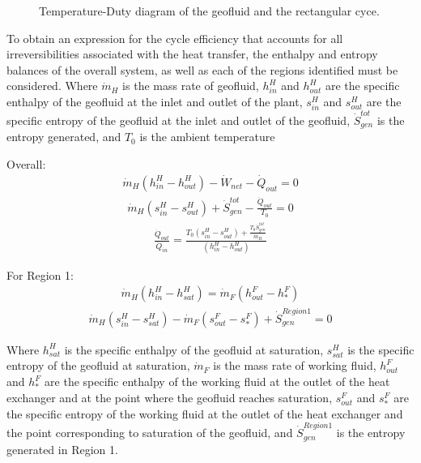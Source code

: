         \begin{figure}[H]
            \centering
            
            \caption{Temperature-Duty diagram of the geofluid and the rectangular cyce.}
            \label{fig:TQ_Rect}
        \end{figure}
        
        To obtain an expression for the cycle efficiency that accounts for all irreversibilities associated with the heat transfer, the enthalpy and entropy balances of the overall system, as well as each of the regions identified must be considered. Where \(\Dot{m}_{H}\) is the mass rate of geofluid, \(h_{in}^{H}\) and \(h_{out}^{H}\) are the specific enthalpy of the geofluid at the inlet and outlet of the plant, \(s_{in}^{H}\) and \(s_{out}^{H}\) are the specific entropy of the geofluid at the inlet and outlet of the geofluid, \(\Dot{S}_{gen}^{tot}\) is the entropy generated, and \(T_0\) is the ambient temperature

        Overall:
        \begin{align}
             \Dot{m}_{H}(h_{in}^{H}-h_{out}^{H}) - \Dot{W}_{net} - \Dot{Q}_{out} = 0 \label{eq:rect_h_bal}
        \end{align}
        \begin{align}
             \Dot{m}_{H}(s_{in}^{H}-s_{out}^{H}) + \Dot{S}_{gen}^{tot} - \frac{\Dot{Q}_{out}}{T_0} = 0 \label{eq:rect_s_bal}
        \end{align}
        \begin{align}
             \frac{\Dot{Q}_{out}}{\Dot{Q}_{in}} = \frac{T_0 (s_{in}^{H}-s_{out}^{H}) + \frac{T_0\Dot{S}_{gen}^{tot}}{\Dot{m}_{H}}}{(h_{in}^{H}-h_{out}^{H})} \label{eq:rect_Qratio}
        \end{align}

        For Region 1:
        \begin{align}
             \Dot{m}_{H}(h_{in}^{H}-h_{sat}^{H}) = \Dot{m}_{F}(h_{out}^{F}-h_{*}^{F}) \label{eq:rect_h_bal_reg1}
        \end{align}
        \begin{align}
            \Dot{m}_{H}(s_{in}^{H}-s_{sat}^{H}) - \Dot{m}_{F}(s_{out}^{F}-s_{*}^{F}) + \Dot{S}_{gen}^{Region 1} = 0 \label{eq:rect_s_bal_reg1}
        \end{align}

        Where \(h_{sat}^{H}\) is the specific enthalpy of the geofluid at  saturation, \(s_{sat}^{H}\) is the specific entropy of the geofluid at saturation, \(\Dot{m}_{F}\) is the mass rate of working fluid, \(h_{out}^{F}\) and \(h_{*}^{F}\) are the specific enthalpy of the working fluid at the outlet of the heat exchanger and at the point where the geofluid reaches saturation, \(s_{out}^{F}\) and \(s_{*}^{F}\) are the specific entropy of the working fluid at the outlet of the heat exchanger and the point corresponding to saturation of the geofluid, and \(\Dot{S}_{gen}^{Region 1}\) is the entropy generated in Region 1.

